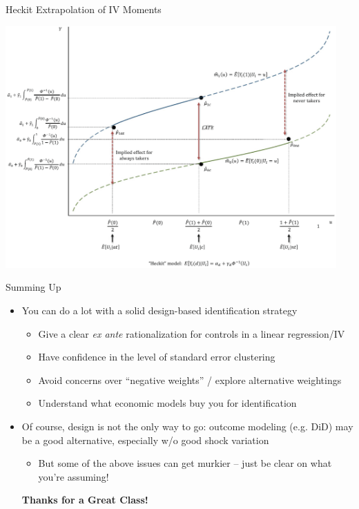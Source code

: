 \documentclass[11pt,english]{beamer}
\begin{document}
\begin{frame}{Heckit Extrapolation of IV Moments}

\begin{center}
	\includegraphics[width=0.95\textwidth]{figures/kw_heckit.png}
\end{center}
\end{frame}

\begin{frame}{Summing Up}
\begin{itemize}
\item You can do a lot with a solid design-based identification strategy\smallskip
\begin{itemize}
\item Give a clear \emph{ex ante} rationalization for controls in a linear regression/IV\smallskip
\item Have confidence in the level of standard error clustering\smallskip
\item Avoid concerns over ``negative weights'' / explore alternative weightings\smallskip
\item Understand what economic models buy you for identification
\end{itemize}\bigskip\pause{}
\item Of course, design is not the only way to go: outcome modeling (e.g. DiD) may be a good alternative, especially w/o good shock variation\smallskip
\begin{itemize}
\item But some of the above issues can get murkier -- just be clear on what you're assuming!
\end{itemize}\bigskip\pause{}

\begin{center}
\textbf{Thanks for a Great Class!}
\end{center}
\end{itemize}

\end{frame}
\end{document}
